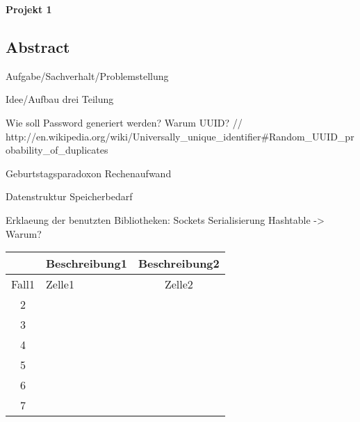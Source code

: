 \documentclass[a4paper,12pt]{article}
\begin{document}
\begin{center}
\Large
\textbf{Projekt 1}
\end{center}
\subsection{Abstract}

Aufgabe/Sachverhalt/Problemstellung

Idee/Aufbau
drei Teilung

Wie soll Password generiert werden?
Warum UUID?
// http://en.wikipedia.org/wiki/Universally_unique_identifier#Random_UUID_probability_of_duplicates 

Geburtstagsparadoxon
Rechenaufwand

Datenstruktur
Speicherbedarf

Erklaeung der benutzten Bibliotheken:
Sockets
Serialisierung
Hashtable -> Warum?

\begin{tabular} [h] {||c|l|c||} 
\hline \rule[-1.5mm]{0pt}{5.5ex} & \normalsize Beschreibung1 & Beschreibung2 \\ 
\hline
\hline \rule[-1.5mm]{0pt}{5.5ex} Fall1 & Zelle1 & Zelle2 \\ 
\hline \rule[-1.5mm]{0pt}{5.5ex} 2 &  & \\ 
\hline \rule[-1.5mm]{0pt}{5.5ex} 3 &  & \\ 
\hline \rule[-1.5mm]{0pt}{5.5ex} 4 &  & \\ 
\hline \rule[-1.5mm]{0pt}{5.5ex} 5 &  & \\ 
\hline \rule[-1.5mm]{0pt}{5.5ex} 6 &  & \\ 
\hline \rule[-1.5mm]{0pt}{5.5ex} 7 &  & \\ 
\hline
\end{tabular}
\end{document}
